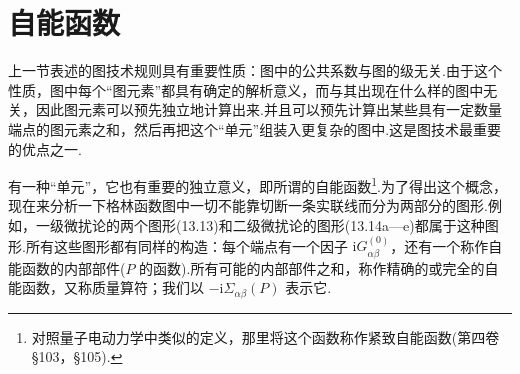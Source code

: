 %
%

\newcommand{\arrL}[3]{\put(#1,#2){\vector(-1,0){#3}}}   %
\newcommand{\tarrL}[3]{\put(#1,#2){{\thicklines\vector(-1,0){#3}}}} %
\newcommand{\dvh}[3]{\multiput(#1,#2)(0,7){#3}{\line(0,1){5}}} %

\section{自能函数}

上一节表述的图技术规则具有重要性质：图中的公共系数与图的级无关.由于这个性质，图中每个“图元素”都具有确定的解析意义，而与其出现在什么样的图中无关，因此图元素可以预先独立地计算出来.并且可以预先计算出某些具有一定数量端点的图元素之和，然后再把这个“单元”组装入更复杂的图中.这是图技术最重要的优点之一.

有一种“单元”，它也有重要的独立意义，即所谓的自能函数\footnote{对照量子电动力学中类似的定义，那里将这个函数称作紧致自能函数(第四卷 §103，§105).}.为了得出这个概念，现在来分析一下格林函数图中一切不能靠切断一条实联线而分为两部分的图形.例如，一级微扰论的两个图形(13.13)和二级微扰论的图形(13.14a—e)都属于这种图形.所有这些图形都有同样的构造：每个端点有一个因子 $\mathrm{i}G^{(0)}_{\alpha\beta}$，还有一个称作自能函数的内部部件($P$ 的函数).所有可能的内部部件之和，称作精确的或完全的自能函数，又称质量算符；我们以 $-\mathrm{i}\Sigma_{\alpha\beta}(P)$ 表示它.

